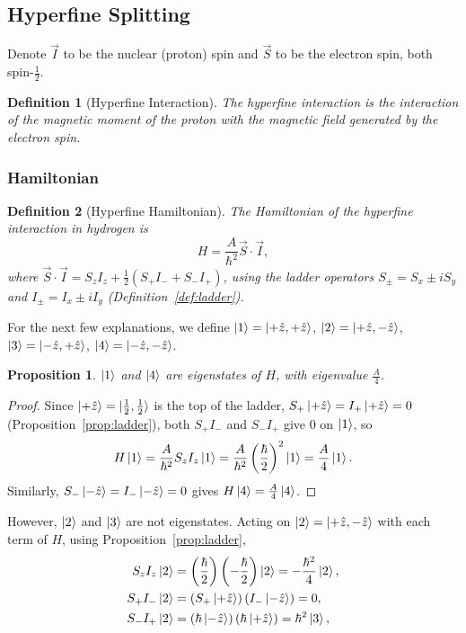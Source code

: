 \documentclass{article}
\newtheorem{definition}{Definition}
\newtheorem{proposition}{Proposition}
\begin{document}
\subsection{Hyperfine Splitting}
Denote $\vec{I}$ to be the nuclear (proton) spin and $\vec{S}$ to be the electron spin, both spin-$\frac{1}{2}$.
\begin{definition}[Hyperfine Interaction]
    The hyperfine interaction is the interaction of the magnetic moment of the proton with the magnetic field generated by the electron spin.
\end{definition}

\subsubsection{Hamiltonian}
\begin{definition}[Hyperfine Hamiltonian]
    The Hamiltonian of the hyperfine interaction in hydrogen is
    \begin{equation}
        H = \frac{A}{\hbar^2}\vec{S}\cdot\vec{I},
    \end{equation}
    where $\vec{S}\cdot\vec{I} = S_zI_z + \frac{1}{2}(S_+I_- + S_-I_+)$, using the ladder operators $S_\pm = S_x \pm iS_y$ and $I_\pm = I_x \pm iI_y$ (Definition~\ref{def:ladder}).
\end{definition}
For the next few explanations, we define $\ket{1} = \ket{+\hat{z},+\hat{z}}$, $\ket{2} = \ket{+\hat{z},-\hat{z}}$, $\ket{3} = \ket{-\hat{z},+\hat{z}}$, $\ket{4} = \ket{-\hat{z},-\hat{z}}$.
\begin{proposition}
    $\ket{1}$ and $\ket{4}$ are eigenstates of $H$, with eigenvalue $\frac{A}{4}$.
\end{proposition}
\begin{proof}
        Since $\ket{+\hat{z}} = \ket{\frac{1}{2},\frac{1}{2}}$ is the top of the ladder, $S_+\ket{+\hat{z}} = I_+\ket{+\hat{z}} = 0$ (Proposition~\ref{prop:ladder}), both $S_+I_-$ and $S_-I_+$ give $0$ on $\ket{1}$, so
    \begin{equation*}
        H\ket{1} = \frac{A}{\hbar^2}S_zI_z\ket{1} = \frac{A}{\hbar^2}\left(\frac{\hbar}{2}\right)^2\ket{1} = \frac{A}{4}\ket{1}.
    \end{equation*}
    Similarly, $S_-\ket{-\hat{z}} = I_-\ket{-\hat{z}} = 0$ gives $H\ket{4} = \frac{A}{4}\ket{4}$.
\end{proof}
However, $\ket{2}$ and $\ket{3}$ are not eigenstates. Acting on $\ket{2} = \ket{+\hat{z},-\hat{z}}$ with each term of $H$, using Proposition~\ref{prop:ladder},
\begin{align*}
    S_zI_z\ket{2} &= \left(\frac{\hbar}{2}\right)\left(-\frac{\hbar}{2}\right)\ket{2} = -\frac{\hbar^2}{4}\ket{2},\\
    S_+I_-\ket{2} &= \left(S_+\ket{+\hat{z}}\right)\left(I_-\ket{-\hat{z}}\right) = 0,\\
    S_-I_+\ket{2} &= \left(\hbar\ket{-\hat{z}}\right)\left(\hbar\ket{+\hat{z}}\right) = \hbar^2\ket{3},
\end{align*}
\end{document}
